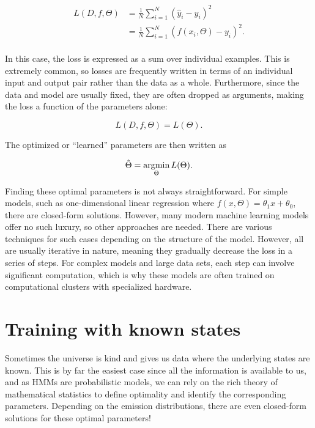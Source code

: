 \begin{align*}
L(D, f, \Theta)
&= \frac{1}{N} \sum_{i=1}^N \left( \hat{y}_i - y_i \right)^2 \\
&= \frac{1}{N} \sum_{i=1}^N \left( f(x_i, \Theta) - y_i \right)^2. \\
\end{align*}

In this case, the loss is expressed as a sum over individual examples. This is extremely common, so losses are frequently written in terms of an individual input and output pair rather than the data as a whole. Furthermore, since the data and model are usually fixed, they are often dropped as arguments, making the loss a function of the parameters alone:

\begin{equation*}
L(D, f, \Theta) = L(\Theta).
\end{equation*}

The optimized or ``learned'' parameters are then written as

\begin{equation*}
\hat{\Theta} = \operatorname*{arg\!\min}_\Theta L(\Theta).
\end{equation*}

Finding these optimal parameters is not always straightforward. For simple models, such as one-dimensional linear regression where $f(x, \Theta) = \theta_1 x + \theta_0$, there are closed-form solutions. However, many modern machine learning models offer no such luxury, so other approaches are needed. There are various techniques for such cases depending on the structure of the model. However, all are usually iterative in nature, meaning they gradually decrease the loss in a series of steps. For complex models and large data sets, each step can involve significant computation, which is why these models are often trained on computational clusters with specialized hardware.

\section{Training with known states}

Sometimes the universe is kind and gives us data where the underlying states are known. This is by far the easiest case since all the information is available to us, and as HMMs are probabilistic models, we can rely on the rich theory of mathematical statistics to define optimality and identify the corresponding parameters. Depending on the emission distributions, there are even closed-form solutions for these optimal parameters!

